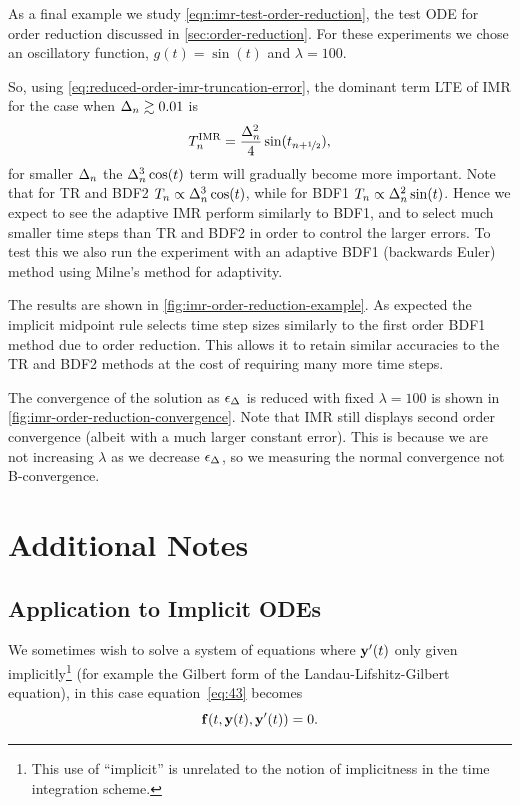 As a final example we study \eqref{eqn:imr-test-order-reduction}, the test ODE for order reduction discussed in \autoref{sec:order-reduction}.
For these experiments we chose an oscillatory function, $g(t) = \sin(t)$ and $\lambda = 100$.

So, using \eqref{eq:reduced-order-imr-truncation-error}, the dominant term LTE of IMR for the case when $\Delta_{n} \gtrsim 0.01$ is
\begin{equation}
  T_n^{\text{IMR}} = \frac{\Delta_{n}^2}{4} \sin(t_{n+\nicefrac{1}{2}}),
\end{equation}
for smaller $\Delta_{n}$ the $\Delta_{n}^3 \cos(t)$ term will gradually become more important.
Note that for TR and BDF2 $T_n \propto \Delta_{n}^3 \cos(t)$, while for BDF1 $T_n \propto \Delta_{n}^2 \sin(t)$.
Hence we expect to see the adaptive IMR perform similarly to BDF1, and to select much smaller time steps than TR and BDF2 in order to control the larger errors.
To test this we also run the experiment with an adaptive BDF1 (backwards Euler) method using Milne's method for adaptivity.

The results are shown in \autoref{fig:imr-order-reduction-example}. 
As expected the implicit midpoint rule selects time step sizes similarly to the first order BDF1 method due to order reduction.
This allows it to retain similar accuracies to the TR and BDF2 methods at the cost of requiring many more time steps.

The convergence of the solution as $\epsilon_{\Delta_{}}$ is reduced with fixed $\lambda = 100$ is shown in \autoref{fig:imr-order-reduction-convergence}.
Note that IMR still displays second order convergence (albeit with a much larger constant error). 
This is because we are not increasing $\lambda$ as we decrease $\epsilon_{\Delta_{}}$, so we measuring the normal convergence not B-convergence.


\section{Additional Notes}

\subsection{Application to Implicit ODEs}
\label{sec:extens-impl-odes}

We sometimes wish to solve a system of equations where $\mathbf{y}'(t)$ only given implicitly\footnote{This use of ``implicit'' is unrelated to the notion of implicitness in the time integration scheme.} (for example the Gilbert form of the Landau-Lifshitz-Gilbert equation), in this case equation~\eqref{eq:43} becomes
\begin{equation}
  {\mathbf{f}{\left( t, \mathbf{y}(t), \mathbf{y}'(t) \right)}} = 0.
\end{equation}

